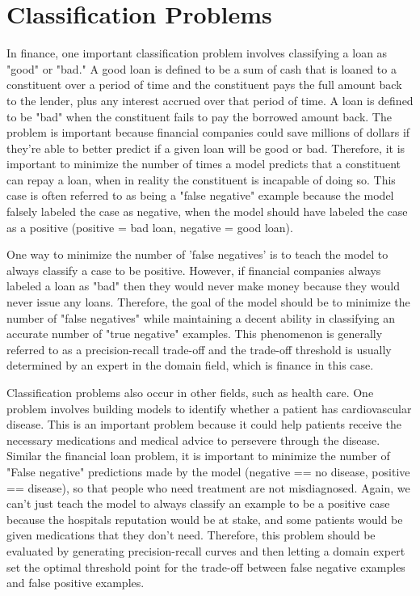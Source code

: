 \documentclass[10pt,journal,compsoc]{IEEEtran}
\begin{document}
\section{Classification Problems}
In finance, one important classification problem involves classifying a loan as "good" or "bad." A good loan is defined to be a sum of cash that is loaned to a constituent over a period of time and the constituent pays the full amount back to the lender, plus any interest accrued over that period of time. A loan is defined to be "bad" when the constituent fails to pay the borrowed amount back. The problem is important because financial companies could save millions of dollars if they're able to better predict if a given loan will be good or bad. Therefore, it is important to minimize the number of times a model predicts that a constituent can repay a loan, when in reality the constituent is incapable of doing so. This case is often referred to as being a "false negative" example because the model falsely labeled the case as negative, when the model should have labeled the case as a positive (positive = bad loan, negative = good loan). 

One way to minimize the number of 'false negatives' is to teach the model to always classify a case to be positive. However, if financial companies always labeled a loan as "bad" then they would never make money because they would never issue any loans. Therefore, the goal of the model should be to minimize the number of "false negatives" while maintaining a decent ability in classifying an accurate number of "true negative" examples. This phenomenon is generally referred to as a precision-recall trade-off and the trade-off threshold is usually determined by an expert in the domain field, which is finance in this case.

Classification problems also occur in other fields, such as health care. One problem involves building models to identify whether a patient has cardiovascular disease. This is an important problem because it could help patients receive the necessary medications and medical advice to persevere through the disease. Similar the financial loan problem, it is important to minimize the number of "False negative" predictions made by the model (negative == no disease, positive == disease), so that people who need treatment are not misdiagnosed. Again, we can't just teach the model to always classify an example to be a positive case because the hospitals reputation would be at stake, and some patients would be given medications that they don't need. Therefore, this problem should be evaluated by generating precision-recall curves and then letting a domain expert set the optimal threshold point for the trade-off between false negative examples and false positive examples.
\end{document}

